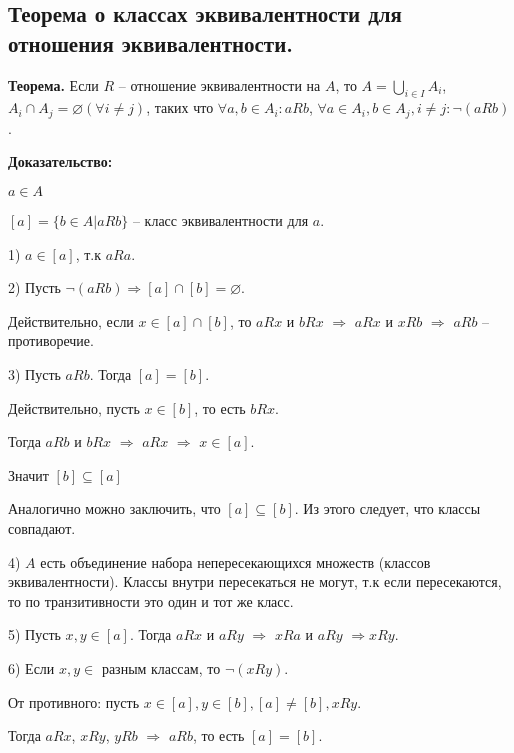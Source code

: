 \subsection{Теорема о классах эквивалентности для отношения эквивалентности.}

\textbf{Теорема.} Если $R$ -- отношение эквивалентности на $A$, то $A = \bigcup_{i \in I}A_i$, $A_i \cap A_j = \varnothing (\forall i \neq j)$, таких что $\forall a, b \in A_i : aRb$, $\forall a \in A_i, b \in A_j, i \neq j : \neg (aRb)$.

\textbf{Доказательство:}

$a \in A$

$[a] = \{b \in A | aRb\}$ -- класс эквивалентности для $a$.

1) $a \in [a]$, т.к $aRa$.

2) Пусть $\neg (aRb) \Rightarrow [a] \cap [b] = \varnothing$.

Действительно, если $x \in [a] \cap [b]$, то $aRx$ и $bRx$ $\Rightarrow$ $aRx$ и $xRb$ 
$\Rightarrow$ $aRb$ -- противоречие.

3) Пусть $aRb$. Тогда $[a] = [b]$.

Действительно, пусть $x \in [b]$, то есть $bRx$.

Тогда $aRb$ и $bRx$ $\Rightarrow$ $aRx$ $\Rightarrow$ $x \in [a]$.

Значит $[b] \subseteq [a]$

Аналогично можно заключить, что $[a] \subseteq [b]$. Из этого следует, что классы совпадают.

4) $A$ есть объединение набора непересекающихся множеств (классов эквивалентности). Классы внутри пересекаться не могут, т.к если пересекаются, то по транзитивности это один и тот же класс.

5) Пусть $x, y \in [a]$. Тогда $aRx$ и $aRy$ $\Rightarrow$ $xRa$ и $aRy$ $\Rightarrow xRy$.

6) Если $x, y \in$ разным классам, то $\neg(xRy)$.

От противного: пусть $x \in [a], y \in [b], [a] \neq [b], xRy$.

Тогда $aRx$, $xRy$, $yRb$ $\Rightarrow$ $aRb$, то есть $[a] = [b]$.
